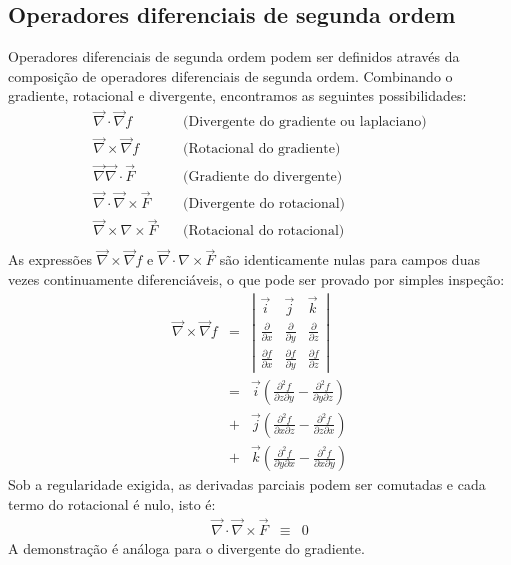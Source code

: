 \subsection{Operadores diferenciais de segunda ordem}
Operadores diferenciais de segunda ordem podem ser definidos através da composição de operadores diferenciais de segunda ordem. Combinando o gradiente, rotacional e divergente, encontramos as seguintes possibilidades:
\begin{eqnarray}
  \vec{\nabla} \cdot \vec{\nabla} f&~& \text{(Divergente do gradiente ou laplaciano)}\\
  \vec{\nabla} \times \vec{\nabla} f&~& \text{(Rotacional do gradiente)}\\
  \vec{\nabla} \vec{\nabla}\cdot \vec{F}&~& \text{(Gradiente do divergente)}\\
  \vec{\nabla} \cdot\vec{\nabla}\times \vec{F}&~& \text{(Divergente do rotacional)}\\
  \vec{\nabla} \times{\nabla}\times \vec{F}&~& \text{(Rotacional do rotacional)}\\
  \end{eqnarray}
As expressões $\vec{\nabla} \times \vec{\nabla} f$ e $\vec{\nabla} \cdot{\nabla}\times \vec{F}$ são identicamente nulas para campos duas vezes continuamente diferenciáveis, o que pode ser provado por simples inspeção:
\begin{eqnarray}
 \vec{\nabla} \times \vec{\nabla} f &=&\left|
 \begin{array}{ccc}
 \vec{i} & \vec{j} & \vec{k} \\
 \frac{\partial}{\partial x} &\frac{\partial}{\partial y} &\frac{\partial}{\partial z} \\
\frac{\partial f}{\partial x} & \frac{\partial f}{\partial y} & \frac{\partial f}{\partial z}
 \end{array}
\right|\\
&=&\vec{i}\left(\frac{\partial^2 f }{\partial z\partial y} - \frac{\partial^2 f}{\partial y\partial z}\right)\\
&+& \vec{j}\left(\frac{\partial^2 f}{\partial  x\partial z}-\frac{\partial^2f}{\partial z\partial x}\right)\\
 &+& \vec{k}\left(\frac{\partial^2 f}{\partial y\partial x}-\frac{\partial^2 f}{\partial x\partial y}\right)
\end{eqnarray}
Sob a regularidade exigida, as derivadas parciais podem ser comutadas e cada termo do rotacional é nulo, isto é:
\begin{eqnarray}
 \vec{\nabla} \cdot \vec{\nabla}\times\vec{F} &\equiv &0
\end{eqnarray}
A demonstração é análoga para o divergente do gradiente.

